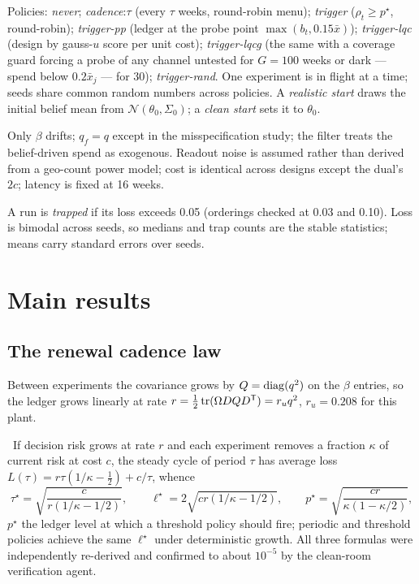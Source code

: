 Policies: \emph{never}; \emph{cadence}:$\tau$ (every $\tau$ weeks, round-robin menu); \emph{trigger} ($\rho_t \ge p^\star$, round-robin); \emph{trigger-pp} (ledger at the probe point $\max(b_t, 0.15\bar x)$); \emph{trigger-lqc} (design by gauss-$u$ score per unit cost); \emph{trigger-lqcg} (the same with a coverage guard forcing a probe of any channel untested for $G = 100$ weeks or dark --- spend below $0.2\bar x_j$ --- for 30); \emph{trigger-rand}. One experiment is in flight at a time; seeds share common random numbers across policies. A \emph{realistic start} draws the initial belief mean from $\mathcal N(\theta_0,\Sigma_0)$; a \emph{clean start} sets it to $\theta_0$.

\begin{assumption}
\label{fusion:ass:main}
Only $\beta$ drifts; $q_f = q$ except in the misspecification study; the filter treats the belief-driven spend as exogenous. Readout noise is assumed rather than derived from a geo-count power model; cost is identical across designs except the dual's $2c$; latency is fixed at 16 weeks.
\end{assumption}

\begin{definition}[Trap]
\label{fusion:def:trap}
A run is \emph{trapped} if its loss exceeds 0.05 (orderings checked at 0.03 and 0.10). Loss is bimodal across seeds, so medians and trap counts are the stable statistics; means carry standard errors over seeds.
\end{definition}

\section{Main results}

\subsection{The renewal cadence law}

Between experiments the covariance grows by $Q = \operatorname{diag}(q^2)$ on the $\beta$ entries, so the ledger grows linearly at rate $r = \tfrac12\operatorname{tr}(\Omega DQD^{\mathsf{T}}) = r_uq^2$, $r_u = 0.208$ for this plant.

\begin{law}
\label{fusion:law:cadence}
\tagEstablished\ If decision risk grows at rate $r$ and each experiment removes a fraction $\kappa$ of current risk at cost $c$, the steady cycle of period $\tau$ has average loss $L(\tau) = r\tau(1/\kappa - \tfrac12) + c/\tau$, whence
\begin{equation}
\tau^\star = \sqrt{\frac{c}{r(1/\kappa - 1/2)}}, \qquad
\ell^\star = 2\sqrt{cr(1/\kappa - 1/2)}, \qquad
p^\star = \sqrt{\frac{cr}{\kappa(1 - \kappa/2)}},
\label{fusion:eq:law}
\end{equation}
$p^\star$ the ledger level at which a threshold policy should fire; periodic and threshold policies achieve the same $\ell^\star$ under deterministic growth. All three formulas were independently re-derived and confirmed to about $10^{-5}$ by the clean-room verification agent.
\end{law}

